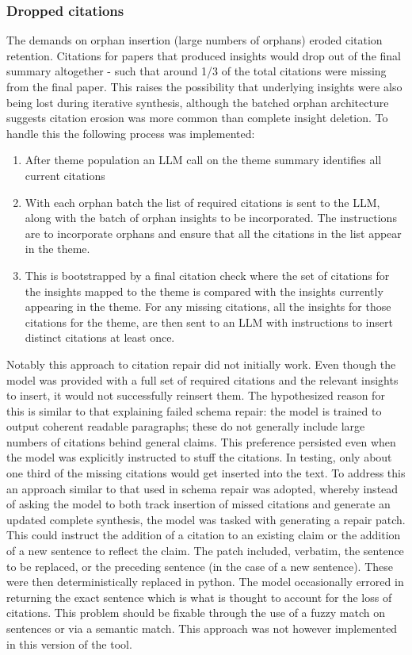\documentclass[
  11pt,
]{article}
\begin{document}
\subsubsection{Dropped citations}\label{dropped-citations}

The demands on orphan insertion (large numbers of orphans) eroded citation retention. 
Citations for papers that produced insights would drop out of the final summary 
altogether - such that around 1/3 of the total citations were missing from the final 
paper. This raises the possibility that underlying insights were also being lost during 
iterative synthesis, although the batched orphan architecture suggests citation erosion 
was more common than complete insight deletion. To handle this the following process was implemented:

\begin{enumerate}
\item After theme population an LLM call on the theme summary identifies all current citations
\item With each orphan batch the list of required citations is sent to the LLM, 
along with the batch of orphan insights to be incorporated. The instructions 
are to incorporate orphans and ensure that all the citations in the list appear in the theme. 
\item This is bootstrapped by a final citation check where the set of citations 
for the insights mapped to the theme is compared with the insights currently 
appearing in the theme. For any missing citations, all the insights for those 
citations for the theme, are then sent to an LLM with instructions to insert distinct citations at least once. 
\end{enumerate}

Notably this approach to citation repair did not initially work. Even though the 
model was provided with a full set of required citations and the relevant insights to 
insert, it would not successfully reinsert them. The hypothesized reason for this is 
similar to that explaining failed schema repair: the model is trained to output coherent 
readable paragraphs; these do not generally include large numbers of citations behind 
general claims. This preference persisted even when the model was explicitly instructed 
to stuff the citations. In testing, only about one third of the missing citations would 
get inserted into the text. To address this an approach similar to that used in schema 
repair was adopted, whereby instead of asking the model to both track insertion of missed 
citations and generate an updated complete synthesis, the model was tasked with generating 
a repair patch. This could instruct the addition of a citation to an existing claim or 
the addition of a new sentence to reflect the claim. The patch included, verbatim, the 
sentence to be replaced, or the preceding sentence (in the case of a new sentence). These were 
then deterministically replaced in python. The model occasionally errored in returning 
the exact sentence which is what is thought to account for the loss of citations. This 
problem should be fixable through the use of a fuzzy match on sentences or via a semantic 
match. This approach was not however implemented in this version of the tool.
\end{document}
